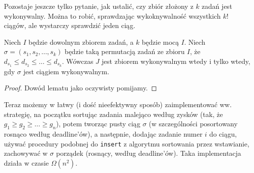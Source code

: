Pozostaje jeszcze tylko pytanie, jak ustalić, czy zbiór złożony z $k$ zadań jest wykonywalny. Można to robić, sprawdzając wykoknywalność wszystkich $k!$ ciągów, ale wystarczy sprawdzić jeden ciąg.

\begin{lemma}
Niech $I$ będzie dowolnym zbiorem zadań, a $k$ będzie mocą $I$.
Niech $\sigma = (s_1, s_2, \dots, s_k)$ będzie taką permutacją zadań ze zbioru $I$, że $d_{s_1} \leq d_{s_2} \leq \dots \leq d_{s_k}$.
Wówczas $J$ jest zbiorem wykonywalnym wtedy i tylko wtedy, gdy $\sigma$ jest ciągiem wykonywalnym.
\end{lemma}

\begin{proof}
Dowód lematu jako oczywisty pomijamy.
\end{proof}

Teraz możemy w łatwy (i dość nieefektywny sposób) zaimplementować ww. strategię, na początku sortując zadania malejąco według zysków (tak, że $g_1 \geq g_2 \geq \dots \geq g_n$), potem tworząc pusty ciąg $\sigma$ (w szczególności posortowany rosnąco według deadline'ów), a następnie, dodając zadanie numer $i$ do ciągu, używać procedury podobnej do \texttt{insert} z algorytmu sortowania przez wstawianie, zachowywać w $\sigma$ porządek (rosnący, według deadline'ów).
Taka implementacja działa w czasie $\Omega(n^2)$.
